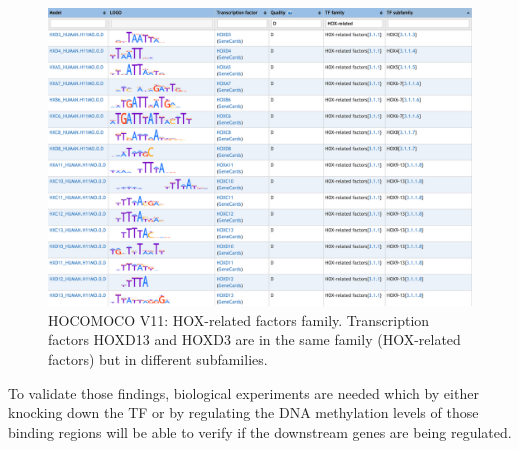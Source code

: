 \begin{center}
\begin{figure}[h!]
\includegraphics[width=16cm]{images/HOCOMOCO.png}
\caption{HOCOMOCO V11: HOX-related factors family. Transcription factors HOXD13 and HOXD3 are in the same family (HOX-related factors) but in different subfamilies.}
\end{figure}
\label{tab:hocomoco}
\end{center}

To validate those findings, biological experiments are needed which by either knocking down the TF or by regulating the DNA methylation levels of those binding regions will be able to verify if the downstream genes are being regulated.


